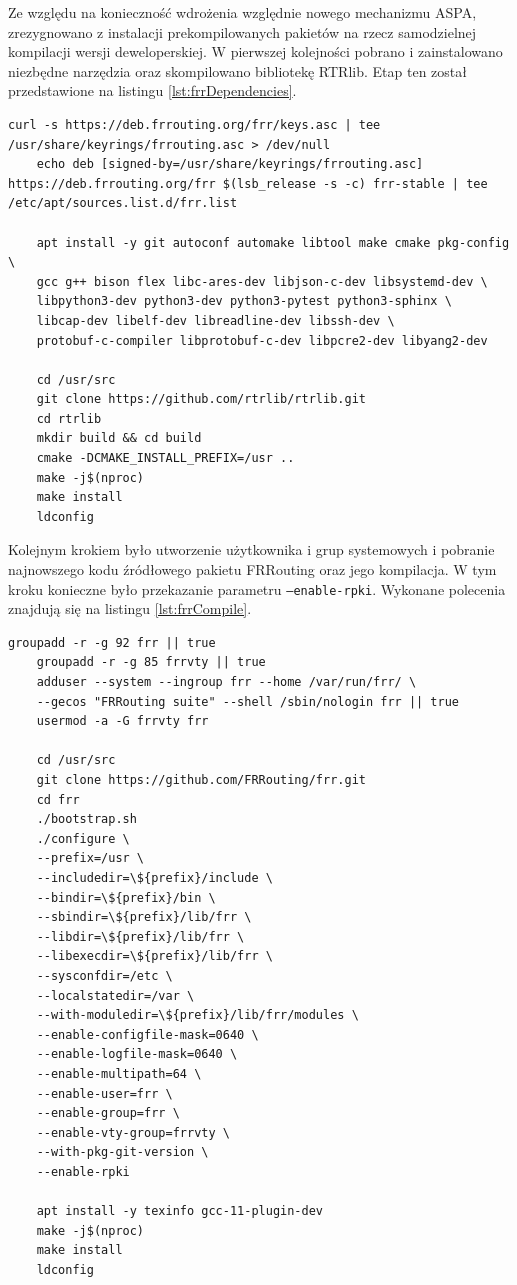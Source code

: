 Ze względu na konieczność wdrożenia względnie nowego mechanizmu ASPA, zrezygnowano z instalacji prekompilowanych pakietów na rzecz samodzielnej kompilacji wersji deweloperskiej. W pierwszej kolejności pobrano i zainstalowano niezbędne narzędzia oraz skompilowano bibliotekę RTRlib. Etap ten został przedstawione na listingu \ref{lst:frrDependencies}.
\begin{lstlisting}[caption={Instalacja zależności oraz biblioteki RTRlib}, label={lst:frrDependencies}]
	curl -s https://deb.frrouting.org/frr/keys.asc | tee /usr/share/keyrings/frrouting.asc > /dev/null 
	echo deb [signed-by=/usr/share/keyrings/frrouting.asc] https://deb.frrouting.org/frr $(lsb_release -s -c) frr-stable | tee /etc/apt/sources.list.d/frr.list 
	
	apt install -y git autoconf automake libtool make cmake pkg-config \
	gcc g++ bison flex libc-ares-dev libjson-c-dev libsystemd-dev \
	libpython3-dev python3-dev python3-pytest python3-sphinx \
	libcap-dev libelf-dev libreadline-dev libssh-dev \
	protobuf-c-compiler libprotobuf-c-dev libpcre2-dev libyang2-dev
	
	cd /usr/src 
	git clone https://github.com/rtrlib/rtrlib.git 
	cd rtrlib 
	mkdir build && cd build 
	cmake -DCMAKE_INSTALL_PREFIX=/usr .. 
	make -j$(nproc) 
	make install 
	ldconfig
\end{lstlisting}

Kolejnym krokiem było utworzenie użytkownika i grup systemowych i pobranie najnowszego kodu źródłowego pakietu FRRouting oraz jego kompilacja. W tym kroku konieczne było przekazanie parametru \texttt{--enable-rpki}. Wykonane polecenia znajdują się na listingu \ref{lst:frrCompile}.
\begin{lstlisting}[caption={Tworzenie użytkowników i kompilacja FRRouting}, label={lst:frrCompile}]
	groupadd -r -g 92 frr || true
	groupadd -r -g 85 frrvty || true
	adduser --system --ingroup frr --home /var/run/frr/ \
	--gecos "FRRouting suite" --shell /sbin/nologin frr || true
	usermod -a -G frrvty frr
	
	cd /usr/src
	git clone https://github.com/FRRouting/frr.git
	cd frr
	./bootstrap.sh
	./configure \
	--prefix=/usr \
	--includedir=\${prefix}/include \
	--bindir=\${prefix}/bin \
	--sbindir=\${prefix}/lib/frr \
	--libdir=\${prefix}/lib/frr \
	--libexecdir=\${prefix}/lib/frr \
	--sysconfdir=/etc \
	--localstatedir=/var \
	--with-moduledir=\${prefix}/lib/frr/modules \
	--enable-configfile-mask=0640 \
	--enable-logfile-mask=0640 \
	--enable-multipath=64 \
	--enable-user=frr \
	--enable-group=frr \
	--enable-vty-group=frrvty \
	--with-pkg-git-version \
	--enable-rpki
	
	apt install -y texinfo gcc-11-plugin-dev 
	make -j$(nproc)
	make install
	ldconfig
\end{lstlisting}

